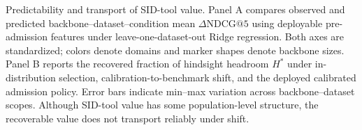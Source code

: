 \caption{
Predictability and transport of SID-tool value.
Panel A compares observed and predicted backbone--dataset--condition mean
$\Delta\mathrm{NDCG}@5$ using deployable pre-admission features under
leave-one-dataset-out Ridge regression. Both axes are standardized; colors
denote domains and marker shapes denote backbone sizes. Panel B reports
the recovered fraction of hindsight headroom $H^*$ under in-distribution
selection, calibration-to-benchmark shift, and the deployed calibrated
admission policy. Error bars indicate min--max variation across
backbone--dataset scopes.
Although SID-tool value has some population-level structure, the recoverable
value does not transport reliably under shift.
}
\label{fig:predictability-transport}
